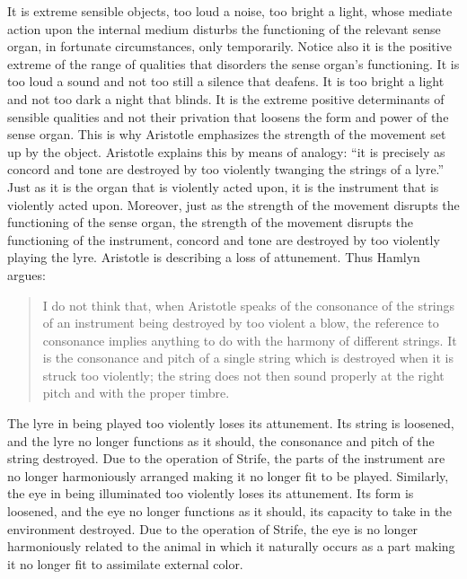 It is extreme sensible objects, too loud a noise, too bright a light, whose mediate action upon the internal medium disturbs the functioning of the relevant sense organ, in fortunate circumstances, only temporarily. Notice also it is the positive extreme of the range of qualities that disorders the sense organ's functioning. It is too loud a sound and not too still a silence that deafens. It is too bright a light and not too dark a night that blinds. It is the extreme positive determinants of sensible qualities and not their privation that loosens the form and power of the sense organ. This is why Aristotle emphasizes the strength of the movement set up by the object. Aristotle explains this by means of analogy: ``it is precisely as concord and tone are destroyed by too violently twanging the strings of a lyre.'' Just as it is the organ that is violently acted upon, it is the instrument that is violently acted upon. Moreover, just as the strength of the movement disrupts the functioning of the sense organ, the strength of the movement disrupts the functioning of the instrument, concord and tone are destroyed by too violently playing the lyre. Aristotle is describing a loss of attunement. Thus Hamlyn argues:
\begin{quote}
	I do not think that, when Aristotle speaks of the consonance of the strings of an instrument being destroyed by too violent a blow, the reference to consonance implies anything to do with the harmony of different strings. It is the consonance and pitch of a single string which is destroyed when it is struck too violently; the string does not then sound properly at the right pitch and with the proper timbre. \citep[114]{Hamlyn:2002ys}
\end{quote}
The lyre in being played too violently loses its attunement. Its string is loosened, and the lyre no longer functions as it should, the consonance and pitch of the string destroyed. Due to the operation of Strife, the parts of the instrument are no longer harmoniously arranged making it no longer fit to be played. Similarly, the eye in being illuminated too violently loses its attunement. Its form is loosened, and the eye no longer functions as it should, its capacity to take in the environment destroyed. Due to the operation of Strife, the eye is no longer harmoniously related to the animal in which it naturally occurs as a part making it no longer fit to assimilate external color. 

